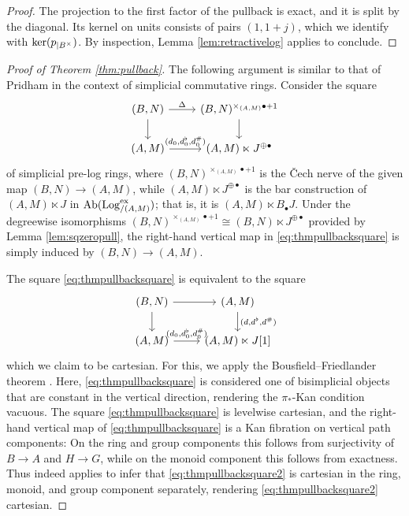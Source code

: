 \documentclass[a4paper,10pt%
]{amsart}
\numberwithin{equation}{section}
\theoremstyle{definition}
\renewcommand{\:}{\colon}
\begin{document}
\begin{proof}  The projection to the first factor of the pullback is exact, and it is split by the diagonal. Its kernel on units consists of pairs $(1, 1 + j)$, which we identify with ${\rm ker}(p_{|B^\times})$. By inspection, Lemma \ref{lem:retractivelog} applies to conclude. 
\end{proof}

\begin{proof}[Proof of Theorem \ref{thm:pullback}] The following argument is similar to that of Pridham \cite[Lemma 1.8]{Pri24} in the context of simplicial commutative rings. Consider the square \begin{equation}\label{eq:thmpullbacksquare}\begin{tikzcd}(B, N) \ar{r}{\Delta} \ar{d} & (B, N)^{\times_{(A, M)} \bullet + 1} \ar{d} \\ (A, M) \ar{r}{(d_0, d_0^\flat, d_0^\#)} & (A, M) \ltimes J^{\oplus \bullet}\end{tikzcd}\end{equation} of simplicial pre-log rings, where $(B, N)^{\times_{(A, M)} \bullet + 1}$ is the \v{C}ech nerve of the given map $(B, N) \to (A, M)$, while $(A, M) \ltimes J^{\oplus \bullet}$ is the bar construction of $(A, M) \ltimes J$ in ${\rm Ab}({\rm Log}^{\rm ex}_{/(A, M)})$; that is, it is $(A, M) \ltimes B_{\bullet}J$. Under the degreewise isomorphisms $(B, N)^{\times_{(A, M)} \bullet + 1} \cong (B, N) \ltimes J^{\oplus \bullet}$ provided by Lemma \ref{lem:sqzeropull}, the right-hand vertical map in \eqref{eq:thmpullbacksquare} is simply induced by $(B, N) \to (A, M)$. 

The square \eqref{eq:thmpullbacksquare} is equivalent to the square \begin{equation}\label{eq:thmpullbacksquare2}\begin{tikzcd}(B, N) \ar{r} \ar{d} & (A, M) \ar{d}{(d, d^\flat, d^\#)} \\ (A, M) \ar{r}{(d_0, d_0^\flat, d_0^\#)} & (A, M) \ltimes J[1]\end{tikzcd}\end{equation} which we claim to be cartesian. For this, we apply the Bousfield--Friedlander theorem \cite[Theorem B.4]{BF78}. Here, \eqref{eq:thmpullbacksquare} is considered one of bisimplicial objects that are constant in the vertical direction, rendering the $\pi_*$-Kan condition vacuous. The square \eqref{eq:thmpullbacksquare} is levelwise cartesian, and the right-hand vertical map of \eqref{eq:thmpullbacksquare} is a Kan fibration on vertical path components: On the ring and group components this follows from surjectivity of $B \to A$ and $H \to G$, while on the monoid component this follows from exactness. Thus \cite[Theorem B.4]{BF78} indeed applies to infer that \eqref{eq:thmpullbacksquare2} is cartesian in the ring, monoid, and group component separately, rendering \eqref{eq:thmpullbacksquare2} cartesian. 


\end{proof}
\end{document}
